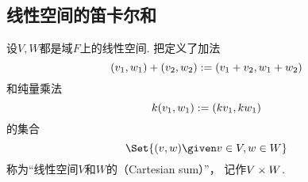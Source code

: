 \subsection{线性空间的笛卡尔和}
\begin{definition}
设\(V,W\)都是域\(F\)上的线性空间.
把定义了加法\begin{equation*}
	(v_1,w_1) + (v_2,w_2) := (v_1+v_2,w_1+w_2)
\end{equation*}
和纯量乘法\begin{equation*}
	k (v_1,w_1) := (k v_1,k w_1)
\end{equation*}
的集合\begin{equation*}
	\Set{
		(v,w)
		\given
		v \in V,
		w \in W
	}
\end{equation*}
称为“线性空间\(V\)和\(W\)的（Cartesian sum）”，
记作\(V \times W\).
\end{definition}

